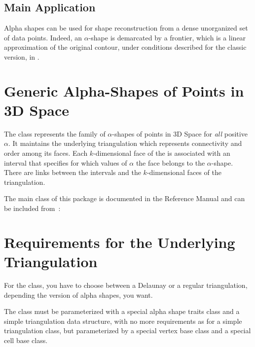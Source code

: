 \subsection*{Main Application}

Alpha shapes can be used for shape reconstruction from a dense unorganized set
of data points. Indeed, an  $\alpha$-shape is demarcated by a frontier, which is
a linear approximation of the original contour, under conditions described for
the classic version, in \cite{bb-srmua-97t}.


\section{Generic Alpha-Shapes of Points in 3D Space \label{I1_SectAlpha_Shape_3}}

The class  represents the family of
$\alpha$-shapes of points in 3D Space for {\em all} positive
$\alpha$. It maintains the underlying triangulation  which
represents connectivity and order among its faces. Each
$k$-dimensional face of the  is associated with
an interval that specifies for which values of $\alpha$ the face
belongs to the $\alpha$-shape. There are links between the intervals
and the $k$-dimensional faces of the triangulation.

The main class of this package is documented in the Reference Manual
 and can be included from~: 



\section{Requirements for the Underlying Triangulation\label{I1_SectDtClass3D}}

For the  class, you have to choose between a Delaunay or a regular
triangulation, depending the version of alpha shapes, you want.

The class  must be parameterized with a special alpha shape
traits class and a simple triangulation data structure, with no more requirements as
for a simple triangulation class, but parameterized by a special vertex base
class and a special cell base class.

